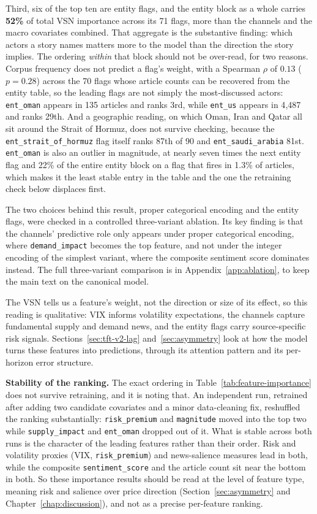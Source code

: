Third, six of the top ten are entity flags, and the entity block as a whole carries \textbf{52\%} of total VSN importance across its 71 flags, more than the channels and the macro covariates combined. That aggregate is the substantive finding: which actors a story names matters more to the model than the direction the story implies. The ordering \emph{within} that block should not be over-read, for two reasons. Corpus frequency does not predict a flag's weight, with a Spearman $\rho$ of $0.13$ ($p = 0.28$) across the 70 flags whose article counts can be recovered from the entity table, so the leading flags are not simply the most-discussed actors: \texttt{ent\_oman} appears in 135 articles and ranks 3rd, while \texttt{ent\_us} appears in 4{,}487 and ranks 29th. And a geographic reading, on which Oman, Iran and Qatar all sit around the Strait of Hormuz, does not survive checking, because the \texttt{ent\_strait\_of\_hormuz} flag itself ranks 87th of 90 and \texttt{ent\_saudi\_arabia} 81st. \texttt{ent\_oman} is also an outlier in magnitude, at nearly seven times the next entity flag and 22\% of the entire entity block on a flag that fires in 1.3\% of articles, which makes it the least stable entry in the table and the one the retraining check below displaces first.

The two choices behind this result, proper categorical encoding and the entity flags, were checked in a controlled three-variant ablation. Its key finding is that the channels' predictive role only appears under proper categorical encoding, where \texttt{demand\_impact} becomes the top feature, and not under the integer encoding of the simplest variant, where the composite sentiment score dominates instead. The full three-variant comparison is in Appendix~\ref{app:ablation}, to keep the main text on the canonical model.

The VSN tells us a feature's weight, not the direction or size of its effect, so this reading is qualitative: VIX informs volatility expectations, the channels capture fundamental supply and demand news, and the entity flags carry source-specific risk signals. Sections~\ref{sec:tft-v2-lag} and~\ref{sec:asymmetry} look at how the model turns these features into predictions, through its attention pattern and its per-horizon error structure.

\textbf{Stability of the ranking.} The exact ordering in Table~\ref{tab:feature-importance} does not survive retraining, and it is noting that. An independent run, retrained after adding two candidate covariates and a minor data-cleaning fix, reshuffled the ranking substantially: \texttt{risk\_premium} and \texttt{magnitude} moved into the top two while \texttt{supply\_impact} and \texttt{ent\_oman} dropped out of it. What is stable across both runs is the character of the leading features rather than their order. Risk and volatility proxies (VIX, \texttt{risk\_premium}) and news-salience measures lead in both, while the composite \texttt{sentiment\_score} and the article count sit near the bottom in both. So these importance results should be read at the level of feature type, meaning risk and salience over price direction (Section~\ref{sec:asymmetry} and Chapter~\ref{chap:discussion}), and not as a precise per-feature ranking.

